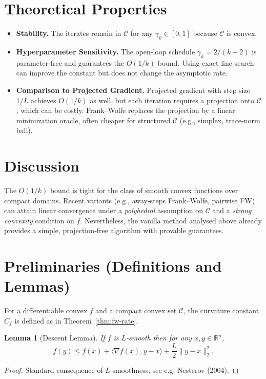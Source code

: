 \documentclass{article}
\newtheorem{lemma}{Lemma}[section]
\begin{document}
\section*{Theoretical Properties}
\begin{itemize}[leftmargin=*]
\item \textbf{Stability.} The iterates remain in $\mathcal{C}$ for any $\gamma_k\in[0,1]$ because $\mathcal{C}$ is convex.
\item \textbf{Hyperparameter Sensitivity.} The open‑loop schedule $\gamma_k=2/(k+2)$ is parameter‑free and guarantees the $O(1/k)$ bound. Using exact line search can improve the constant but does not change the asymptotic rate.
\item \textbf{Comparison to Projected Gradient.} Projected gradient with step size $1/L$ achieves $O(1/k)$ as well, but each iteration requires a projection onto $\mathcal{C}$, which can be costly. Frank–Wolfe replaces the projection by a linear minimization oracle, often cheaper for structured $\mathcal{C}$ (e.g., simplex, trace‑norm ball).
\end{itemize}

\section*{Discussion}
The $O(1/k)$ bound is tight for the class of smooth convex functions over compact domains. Recent variants (e.g., away‑steps Frank–Wolfe, pairwise FW) can attain linear convergence under a \emph{polyhedral} assumption on $\mathcal{C}$ and a \emph{strong convexity} condition on $f$. Nevertheless, the vanilla method analysed above already provides a simple, projection‑free algorithm with provable guarantees.

\newpage
\section*{Preliminaries (Definitions and Lemmas)}
\begin{definition}\label{def:curvature}
For a differentiable convex $f$ and a compact convex set $\mathcal{C}$, the curvature constant $C_f$ is defined as in Theorem~\ref{thm:fw-rate}.
\end{definition}

\begin{lemma}[Descent Lemma]\label{lem:descent}
If $f$ is $L$‑smooth then for any $x,y\in\mathbb{R}^n$,
\[
f(y)\le f(x)+\langle\nabla f(x),y-x\rangle+\frac{L}{2}\|y-x\|_2^2 .
\]
\end{lemma}
\begin{proof}
Standard consequence of $L$‑smoothness; see e.g. Nesterov (2004). \qedhere
\end{proof}
\end{document}
